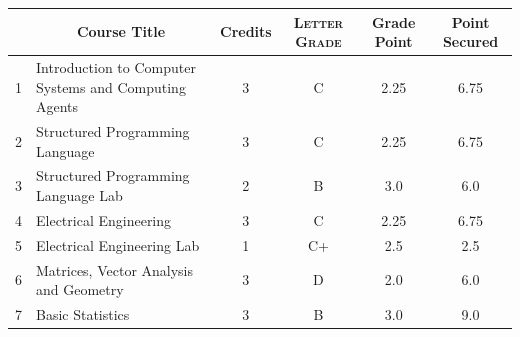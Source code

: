 \documentclass[11pt]{article}
\newcommand*{\numtwo}[1]{\pgfmathprintnumber[
                    fixed, precision=2, fixed zerofill=true]{#1}}
\begin{document}
                \begin{center}
                    \renewcommand{\arraystretch}{1.08}
                    
                \begin{tabular}{|c|l|c|>{\scshape}c|c|c|}
                \hline  \rule[-1ex]{0pt}{3.5ex} {\centering{\bf Course Code}} &  \multicolumn{1}{c|}{\textbf{Course Title}}  & {\bf Credits} & {\bf Letter Grade} & {\bf Grade Point} & {\bf Point Secured}  \\ 
                \hline   1 &  Introduction to Computer Systems and Computing Agents		 & 3 & C & 2.25 & 6.75 \\ %
                \hline   2 &  Structured Programming Language		 & 3 & C & 2.25 & 6.75 \\ %
                \hline   3 &  Structured Programming Language Lab		 & 2 & B & 3.0 & 6.0 \\ %
                \hline   4 &  Electrical Engineering		 & 3 & C & 2.25 & 6.75 \\ %
                \hline   5 &  Electrical Engineering Lab		 & 1 & C+ & 2.5 & 2.5 \\ %
                \hline   6 &  Matrices, Vector Analysis and Geometry		 & 3 & D & 2.0 & 6.0 \\ %
                \hline   7 &  Basic Statistics		 & 3 & B & 3.0 & 9.0 \\ %

\hline                %
                \end{tabular}
                \end{center}
                \renewcommand{\arraystretch}{1.03}
\end{document}
